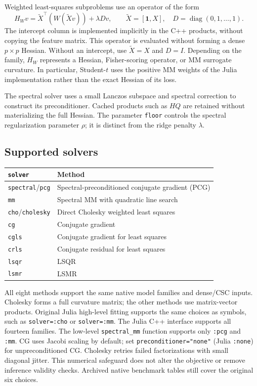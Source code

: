 \documentclass[11pt,a4paper]{article}
\newcommand{\code}[1]{\texttt{#1}}
\begin{document}
Weighted least-squares subproblems use an operator of the form
\[
 H_Wv=\widetilde X^\top\!\left(W(\widetilde Xv)\right)+\lambda Dv,
 \qquad \widetilde X=[\mathbf{1},X],\quad D=\operatorname{diag}(0,1,\ldots,1).
\]
The intercept column is implemented implicitly in the C++ products, without
copying the feature matrix. This operator is evaluated without forming a dense
$p\times p$ Hessian. Without an intercept, use $\widetilde X=X$ and $D=I$.
Depending on the family, $H_W$ represents a Hessian, Fisher-scoring operator, or
MM surrogate curvature. In particular, Student-$t$ uses the positive MM weights
of the Julia implementation rather than the exact Hessian of its loss.

The spectral solver uses a small Lanczos subspace and spectral correction to
construct its preconditioner. Cached products such as $HQ$ are retained without
materializing the full Hessian. The parameter \code{floor} controls the spectral
regularization parameter $\rho$; it is distinct from the ridge penalty $\lambda$.

\subsection{Supported solvers}
\begin{center}
\begin{tabular}{ll}
\toprule
\code{solver} & Method \\
\midrule
\code{spectral}/\code{pcg} & Spectral-preconditioned conjugate gradient (PCG) \\
\code{mm} & Spectral MM with quadratic line search \\
\code{cho}/\code{cholesky} & Direct Cholesky weighted least squares \\
\code{cg} & Conjugate gradient \\
\code{cgls} & Conjugate gradient for least squares \\
\code{crls} & Conjugate residual for least squares \\
\code{lsqr} & LSQR \\
\code{lsmr} & LSMR \\
\bottomrule
\end{tabular}
\end{center}
All eight methods support the same native model families and dense/CSC inputs.
Cholesky forms a full curvature matrix; the other methods use matrix-vector products.
Original Julia high-level fitting supports the same choices as symbols, such as
\code{solver=:cho} or \code{solver=:mm}. The Julia C++ interface supports all fourteen families. The low-level \code{spectral\_mm} function
supports only \code{:pcg} and \code{:mm}. CG uses Jacobi scaling by default;
set \code{preconditioner="none"} (Julia \code{:none}) for unpreconditioned CG.
Cholesky retries failed factorizations with small diagonal jitter. This numerical
safeguard does not alter the objective or remove inference validity checks.
Archived native benchmark tables still cover the original six choices.
\end{document}
